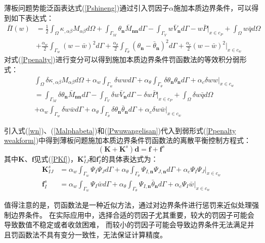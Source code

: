 薄板问题势能泛函表达式(\ref{Pshineng})通过引入罚因子$\alpha$施加本质边界条件，可以得到如下表达式：
\begin{equation}\label{Ppenalty}
\begin{split}
        \bar{\Pi}(w)&=\frac{1}{2}\int_{\Omega}\kappa_{,\alpha\beta}M_{\alpha\beta}d\Omega+\int_{\Gamma_M}\theta_{\pmb{n}}\bar{M}_{\pmb{nn}}d\Gamma-\int_{\Gamma_V}w\bar{V}_{\pmb{n}}d\Gamma-w\bar{P}\vert_{x\in c_P}+\int_{\Omega}w\bar{q}d\Omega\\
    &+\frac{\alpha_w}{2}\int_{\Gamma_w}(w-\bar{w})^2d\Gamma+\frac{\alpha_{\theta}}{2}\int_{\Gamma_{\theta}}(\theta_{\pmb{n}}-\bar{\theta}_{\pmb{n}})^2d\Gamma+\frac{\alpha_c}{2}(w-\bar{w})^2\vert_{x\in c_w}
\end{split}
\end{equation}
对式(\ref{Ppenalty})进行变分可以得到施加本质边界条件罚函数法的等效积分弱形式：
\begin{equation}\label{Ppenalty weakform}
\begin{split}
    &\int_{\Omega}\delta\kappa_{,\alpha\beta}M_{\alpha\beta}d\Omega
    +\alpha_w\int_{\Gamma_w}\delta wwd\Gamma+\alpha_{\theta}\int_{\Gamma_{\theta}}\delta\theta_{\pmb{n}}\theta_{\pmb{n}}d\Gamma+\alpha_c\delta ww\vert_{x\in c_w}\\
    &=\int_{\Gamma_M}\delta\theta_{\pmb{n}}\bar{M}_{\pmb{nn}}d\Gamma-\int_{\Gamma_V}\delta w\bar{V}_{\pmb{n}}d\Gamma-\delta w\bar{P}\vert_{x\in c_P}+\int_{\Omega}\delta w\bar{q}d\Omega\\
    &+\alpha_w\int_{\Gamma_w}\delta w\bar{w}d\Gamma+\alpha_{\theta}\int_{\Gamma_{\theta}}\delta\theta_{\pmb{n}}\bar{\theta}_{\pmb{n}}d\Gamma+\alpha_c\delta w\bar{w}\vert_{x\in c_w}
\end{split}
\end{equation}\par
引入式(\ref{wn})、(\ref{Malphabeta})和(\ref{Pwuwangelisan})代入到弱形式(\ref{Ppenalty weakform})中得到薄板问题施加本质边界条件罚函数法的离散平衡控制方程式：
\begin{equation}
    (\pmb{K}+\pmb{K}^s)\pmb{d}=\pmb{f}+\pmb{f}^s
\end{equation}
其中$\pmb{K}$、$\pmb{f}$见式(\ref{PKf})，$\pmb K^s_{I\!J}$和$\pmb f^s_I$的具体表达式为：
\begin{subequations}
\begin{align}
   \pmb K^s_{I\!J}&=\alpha_w\int_{\Gamma_w}\Psi_I\Psi_Jd\Gamma+\alpha_{\theta}\int_{\Gamma_{\theta}}\Psi_{I,\pmb n}\Psi_{J,\pmb n}d\Gamma+\alpha_c\Psi_I\Psi_J\vert_{x\in c_w}\\
\pmb f^s_I&=\alpha_w\int_{\Gamma_w}\Psi_I\bar{w}d\Gamma+\alpha_{\theta}\int_{\Gamma_{\theta}}\Psi_{I,\pmb n}\bar{\theta}_{\pmb n}d\Gamma+\alpha_c\Psi_I\bar{w}\vert_{x\in c_w}
\end{align}
\end{subequations}\par
值得注意的是，罚函数法是一种近似方法，通过对边界条件进行惩罚来近似处理强制边界条件。
在实际应用中，选择合适的罚因子尤其重要，较大的罚因子可能会导致数值不稳定或者收敛困难，
而较小的罚因子可能会导致边界条件无法满足并且罚函数法不具有变分一致性，无法保证计算精度。
